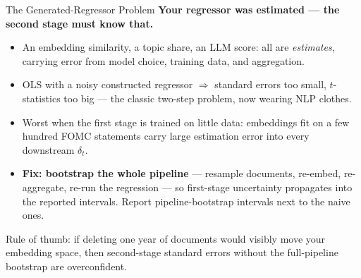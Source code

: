 \begin{frame}{The Generated-Regressor Problem}
\textbf{Your regressor was estimated --- the second stage must know that.}
\begin{itemize}
\item An embedding similarity, a topic share, an LLM score: all are \emph{estimates}, carrying error from model choice, training data, and aggregation.
\item OLS with a noisy constructed regressor $\Rightarrow$ standard errors too small, $t$-statistics too big --- the classic two-step problem, now wearing NLP clothes.
\item Worst when the first stage is trained on little data: embeddings fit on a few hundred FOMC statements carry large estimation error into every downstream $\delta_t$.
\item \textbf{Fix: bootstrap the whole pipeline} --- resample documents, re-embed, re-aggregate, re-run the regression --- so first-stage uncertainty propagates into the reported intervals. Report pipeline-bootstrap intervals next to the naive ones.
\end{itemize}
\medskip
\begin{takeawaybox}
Rule of thumb: if deleting one year of documents would visibly move your embedding space, then second-stage standard errors without the full-pipeline bootstrap are overconfident.
\end{takeawaybox}
\end{frame}

